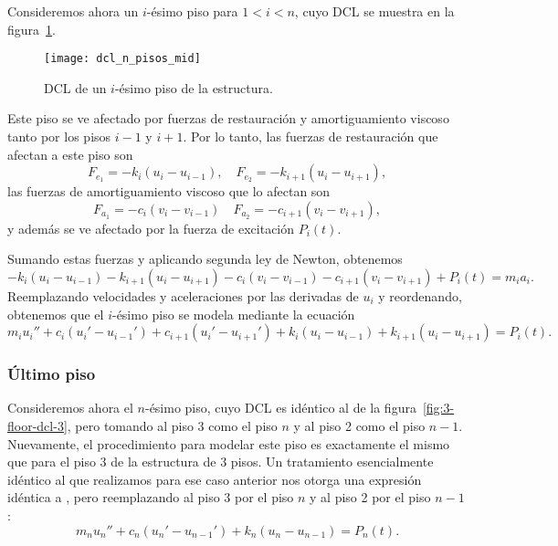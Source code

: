 Consideremos ahora un \(i\)-ésimo piso para \(1 < i < n\), cuyo DCL se muestra en la figura~\ref{fig:n-floor-dcl-mid}.

\begin{figure}[h]
    \centering
    \texttt{[image: dcl\_n\_pisos\_mid]}
    \caption{DCL de un \(i\)-ésimo piso de la estructura.}
    \label{fig:n-floor-dcl-mid}
\end{figure}

Este piso se ve afectado por fuerzas de restauración y amortiguamiento viscoso tanto por los pisos \(i - 1\) y \(i + 1\). Por lo tanto, las fuerzas de restauración que afectan a este piso son
\[
    F_{e_1} = -k_i(u_i - u_{i-1}), \quad F_{e_2} = -k_{i+1}(u_i - u_{i+1})
,\]
las fuerzas de amortiguamiento viscoso que lo afectan son
\[
    F_{a_1} = -c_i(v_i - v_{i-1}) \quad F_{a_2} = -c_{i+1}(v_i - v_{i+1})
,\]
y además se ve afectado por la fuerza de excitación \(P_i(t)\).

Sumando estas fuerzas y aplicando segunda ley de Newton, obtenemos
\[
    -k_i(u_i - u_{i-1}) - k_{i+1}(u_i - u_{i+1}) - c_i(v_i - v_{i-1}) - c_{i+1}(v_i - v_{i+1}) + P_i(t) = m_i a_i
.\]
Reemplazando velocidades y aceleraciones por las derivadas de \(u_i\) y reordenando, obtenemos que el \(i\)-ésimo piso se modela mediante la ecuación
\begin{equation}\label{eqn:final-floor-mid}
    m_i u_i'' + c_i(u_i' - u_{i-1}') + c_{i+1}(u_i' - u_{i+1}') + k_i(u_i - u_{i-1}) + k_{i+1}(u_i - u_{i+1}) = P_i(t)
.\end{equation}

\subsubsection*{Último piso}

Consideremos ahora el \(n\)-ésimo piso, cuyo DCL es idéntico al de la figura~\ref{fig:3-floor-dcl-3}, pero tomando al piso 3 como el piso \(n\) y al piso 2 como el piso \(n - 1\). Nuevamente, el procedimiento para modelar este piso es exactamente el mismo que para el piso 3 de la estructura de 3 pisos. Un tratamiento esencialmente idéntico al que realizamos para ese caso anterior nos otorga una expresión idéntica a , pero reemplazando al piso 3 por el piso \(n\) y al piso 2 por el piso \(n - 1\):
\begin{equation}\label{eqn:final-floor-last}
    m_n u_n'' + c_n(u_n' - u_{n-1}') + k_n(u_n - u_{n-1}) = P_n(t)
.\end{equation}


